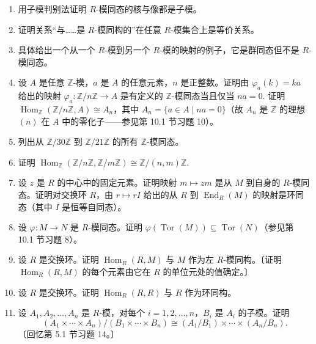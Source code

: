 \begin{enumerate}
\item 用子模判别法证明 \(R\)-模同态的核与像都是子模。

\item 证明关系“与……是 \(R\)-模同构的”在任意 \(R\)-模集合上是等价关系。

\item 具体给出一个从一个 \(R\)-模到另一个 \(R\)-模的映射的例子，它是群同态但不是 \(R\)-模同态。

\item 设 \(A\) 是任意 \(\mathbb{Z}\)-模，\(a\) 是 \(A\) 的任意元素，\(n\) 是正整数。证明由 \(\varphi_a(k) = ka\) 给出的映射 \(\varphi_a : \mathbb{Z}/n\mathbb{Z} \to A\) 是有定义的 \(\mathbb{Z}\)-模同态当且仅当 \(na = 0\). 证明 \(\operatorname{Hom}_{\mathbb{Z}}(\mathbb{Z}/n\mathbb{Z}, A) \cong A_n\)，其中 \(A_n = \{a \in A \mid na = 0\}\)（故 \(A_n\) 是 \(\mathbb{Z}\) 的理想 \((n)\) 在 \(A\) 中的零化子——参见第 10.1 节习题 10）。

\item 列出从 \(\mathbb{Z}/30\mathbb{Z}\) 到 \(\mathbb{Z}/21\mathbb{Z}\) 的所有 \(\mathbb{Z}\)-模同态。

\item 证明 \(\operatorname{Hom}_{\mathbb{Z}}(\mathbb{Z}/n\mathbb{Z}, \mathbb{Z}/m\mathbb{Z}) \cong \mathbb{Z}/(n, m)\mathbb{Z}\).

\item 设 \(z\) 是 \(R\) 的中心中的固定元素。证明映射 \(m \mapsto zm\) 是从 \(M\) 到自身的 \(R\)-模同态。证明对交换环 \(R\)，由 \(r \mapsto rI\) 给出的从 \(R\) 到 \(\operatorname{End}_R(M)\) 的映射是环同态（其中 \(I\) 是恒等自同态）。

\item 设 \(\varphi : M \to N\) 是 \(R\)-模同态。证明 \(\varphi(\operatorname{Tor}(M)) \subseteq \operatorname{Tor}(N)\)（参见第 10.1 节习题 8）。

\item 设 \(R\) 是交换环。证明 \(\operatorname{Hom}_R(R, M)\) 与 \(M\) 作为左 \(R\)-模同构。〔证明 \(\operatorname{Hom}_R(R, M)\) 的每个元素由它在 \(R\) 的单位元处的值确定。〕

\item 设 \(R\) 是交换环。证明 \(\operatorname{Hom}_R(R, R)\) 与 \(R\) 作为环同构。

\item 设 \(A_1, A_2, \ldots, A_n\) 是 \(R\)-模，对每个 \(i = 1, 2, \ldots, n\)，\(B_i\) 是 \(A_i\) 的子模。证明
\[
(A_1 \times \cdots \times A_n)/(B_1 \times \cdots \times B_n) \cong (A_1/B_1) \times \cdots \times (A_n/B_n).
\]
〔回忆第 5.1 节习题 14。〕


\end{enumerate}

